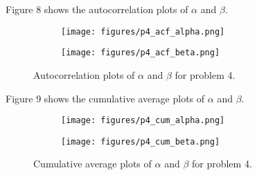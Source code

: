 \documentclass[12pt]{article}
\begin{document}
Figure 8 shows the autocorrelation plots of $\alpha$ and $\beta$.

\begin{figure}[H]
\begin{subfigure}{.5\textwidth}
  \centering
  \texttt{[image: figures/p4\_acf\_alpha.png]}
\end{subfigure}
\begin{subfigure}{.5\textwidth}
  \centering
  \texttt{[image: figures/p4\_acf\_beta.png]}
\end{subfigure}
\caption{Autocorrelation plots of $\alpha$ and $\beta$ for problem 4.}
\end{figure}

Figure 9 shows the cumulative average plots of $\alpha$ and $\beta$.

\begin{figure}[H]
\begin{subfigure}{.5\textwidth}
  \centering
  \texttt{[image: figures/p4\_cum\_alpha.png]}
\end{subfigure}
\begin{subfigure}{.5\textwidth}
  \centering
  \texttt{[image: figures/p4\_cum\_beta.png]}
\end{subfigure}
\caption{Cumulative average plots of $\alpha$ and $\beta$ for problem 4.}
\end{figure}

\vspace{10mm}
\end{document}

